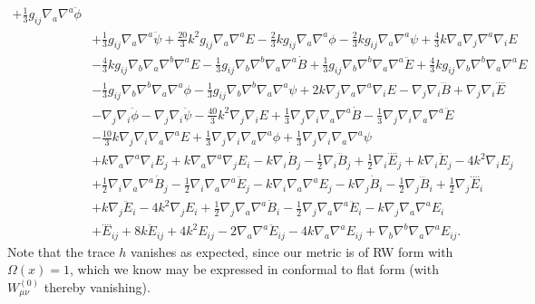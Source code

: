 \documentclass[10pt,letterpaper]{article}
\begin{document}
\begin{align}
 + \tfrac{1}{3} g_{ij} \nabla_{a}\nabla^{a}\ddot{\phi}\nonumber\\
& + \tfrac{1}{3} g_{ij} \nabla_{a}\nabla^{a}\ddot{\psi}
 + \tfrac{20}{3} k^2 g_{ij} \nabla_{a}\nabla^{a}E
 -  \tfrac{2}{3} k g_{ij} \nabla_{a}\nabla^{a}\phi
 -  \tfrac{2}{3} k g_{ij} \nabla_{a}\nabla^{a}\psi
 + \tfrac{4}{3} k \nabla_{a}\nabla_{j}\nabla^{a}\nabla_{i}E\nonumber\\
& -  \tfrac{4}{3} k g_{ij} \nabla_{b}\nabla_{a}\nabla^{b}\nabla^{a}E
 -  \tfrac{1}{3} g_{ij} \nabla_{b}\nabla^{b}\nabla_{a}\nabla^{a}\dot{B}
 + \tfrac{1}{3} g_{ij} \nabla_{b}\nabla^{b}\nabla_{a}\nabla^{a}\ddot{E}
 + \tfrac{4}{3} k g_{ij} \nabla_{b}\nabla^{b}\nabla_{a}\nabla^{a}E\nonumber\\
& -  \tfrac{1}{3} g_{ij} \nabla_{b}\nabla^{b}\nabla_{a}\nabla^{a}\phi
 -  \tfrac{1}{3} g_{ij} \nabla_{b}\nabla^{b}\nabla_{a}\nabla^{a}\psi
 + 2 k \nabla_{j}\nabla_{a}\nabla^{a}\nabla_{i}E
 -  \nabla_{j}\nabla_{i}\dddot{B}
 + \nabla_{j}\nabla_{i}\overset{\text{...}.}{E}\nonumber\\
& -  \nabla_{j}\nabla_{i}\ddot{\phi}
 -  \nabla_{j}\nabla_{i}\ddot{\psi}
 -  \tfrac{40}{3} k^2 \nabla_{j}\nabla_{i}E
 + \tfrac{1}{3} \nabla_{j}\nabla_{i}\nabla_{a}\nabla^{a}\dot{B}
 -  \tfrac{1}{3} \nabla_{j}\nabla_{i}\nabla_{a}\nabla^{a}\ddot{E}\nonumber\\
& -  \tfrac{10}{3} k \nabla_{j}\nabla_{i}\nabla_{a}\nabla^{a}E
 + \tfrac{1}{3} \nabla_{j}\nabla_{i}\nabla_{a}\nabla^{a}\phi
 + \tfrac{1}{3} \nabla_{j}\nabla_{i}\nabla_{a}\nabla^{a}\psi
\nonumber\\
& +k \nabla_{a}\nabla^{a}\nabla_{i}E_{j}
 + k \nabla_{a}\nabla^{a}\nabla_{j}E_{i}
 -  k \nabla_{i}\dot{B}_{j}
 -  \tfrac{1}{2} \nabla_{i}\dddot{B}_{j}
 + \tfrac{1}{2} \nabla_{i}\overset{\text{...}.}{E}_{j}
 + k \nabla_{i}\ddot{E}_{j}
 - 4 k^2 \nabla_{i}E_{j}\nonumber\\
& + \tfrac{1}{2} \nabla_{i}\nabla_{a}\nabla^{a}\dot{B}_{j}
 -  \tfrac{1}{2} \nabla_{i}\nabla_{a}\nabla^{a}\ddot{E}_{j}
 -  k \nabla_{i}\nabla_{a}\nabla^{a}E_{j}
 -  k \nabla_{j}\dot{B}_{i}
 -  \tfrac{1}{2} \nabla_{j}\dddot{B}_{i}
 + \tfrac{1}{2} \nabla_{j}\overset{\text{...}.}{E}_{i}\nonumber\\
& + k \nabla_{j}\ddot{E}_{i}
 - 4 k^2 \nabla_{j}E_{i}
 + \tfrac{1}{2} \nabla_{j}\nabla_{a}\nabla^{a}\dot{B}_{i}
 -  \tfrac{1}{2} \nabla_{j}\nabla_{a}\nabla^{a}\ddot{E}_{i}
 -  k \nabla_{j}\nabla_{a}\nabla^{a}E_{i}
\nonumber\\
& +\overset{\text{...}.}{E}_{ij}
 + 8 k \ddot{E}_{ij}
 + 4 k^2 E_{ij}
 - 2 \nabla_{a}\nabla^{a}\ddot{E}_{ij}
 - 4 k \nabla_{a}\nabla^{a}E_{ij}
 + \nabla_{b}\nabla^{b}\nabla_{a}\nabla^{a}E_{ij}.
\end{align}
Note that the trace $h$ vanishes as expected, since our metric is of RW form with $\Omega(x)=1$, which we know may be expressed in conformal to flat form (with $W_{\mu\nu}^{(0)}$ thereby vanishing).
\end{document}
